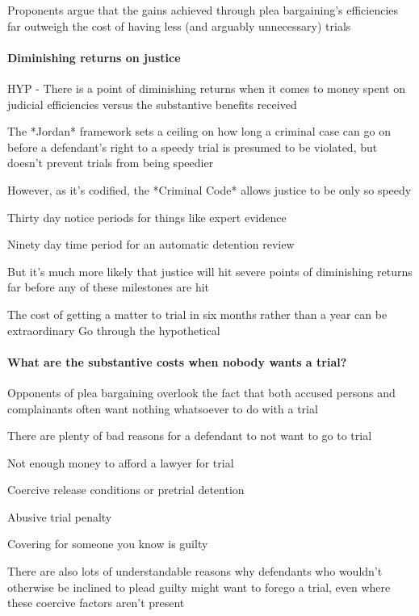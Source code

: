 Proponents argue that the gains achieved through plea bargaining's efficiencies far outweigh the cost of having less (and arguably unnecessary) trials

\paragraph{Diminishing returns on justice}

HYP - There is a point of diminishing returns when it comes to money spent on judicial efficiencies versus the substantive benefits received

The *Jordan* framework sets a ceiling on how long a criminal case can go on before a defendant's right to a speedy trial is presumed to be violated, but doesn't prevent trials from being speedier

However, as it's codified, the *Criminal Code* allows justice to be only so speedy

Thirty day notice periods for things like expert evidence

Ninety day time period for an automatic detention review

But it's much more likely that justice will hit severe points of diminishing returns far before any of these milestones are hit

The cost of getting a matter to trial in six months rather than a year can be extraordinary
Go through the hypothetical

\paragraph{What are the substantive costs when nobody wants a trial?}

Opponents of plea bargaining overlook the fact that both accused persons and complainants often want nothing whatsoever to do with a trial

There are plenty of bad reasons for a defendant to not want to go to trial

Not enough money to afford a lawyer for trial

Coercive release conditions or pretrial detention

Abusive trial penalty

Covering for someone you know is guilty

There are also lots of understandable reasons why defendants who wouldn't otherwise be inclined to plead guilty might want to forego a trial, even where these coercive factors aren't present

